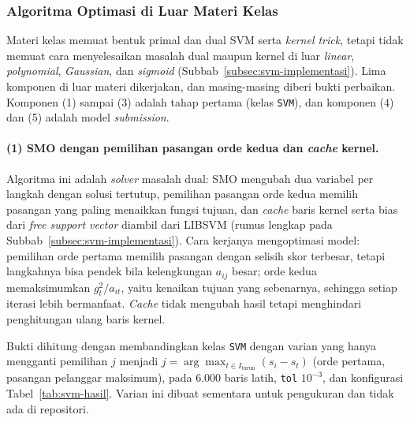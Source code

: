 \subsubsection{Algoritma Optimasi di Luar Materi Kelas}
\label{subsubsec:svm-optimasi}
Materi kelas memuat bentuk primal dan dual SVM serta \textit{kernel trick}, tetapi tidak memuat cara menyelesaikan masalah dual maupun kernel di luar \textit{linear}, \textit{polynomial}, \textit{Gaussian}, dan \textit{sigmoid} (Subbab~\ref{subsec:svm-implementasi}). Lima komponen di luar materi dikerjakan, dan masing-masing diberi bukti perbaikan. Komponen (1) sampai (3) adalah tahap pertama (kelas \texttt{SVM}), dan komponen (4) dan (5) adalah model \textit{submission}.

\paragraph{(1) SMO dengan pemilihan pasangan orde kedua dan \textit{cache} kernel.} Algoritma ini adalah \textit{solver} masalah dual: SMO \cite{platt1998smo} mengubah dua variabel per langkah dengan solusi tertutup, pemilihan pasangan orde kedua \cite{fan2005wss} memilih pasangan yang paling menaikkan fungsi tujuan, dan \textit{cache} baris kernel serta bias dari \textit{free support vector} diambil dari LIBSVM \cite{chang2011libsvm} (rumus lengkap pada Subbab~\ref{subsec:svm-implementasi}). Cara kerjanya mengoptimasi model: pemilihan orde pertama memilih pasangan dengan selisih skor terbesar, tetapi langkahnya bisa pendek bila kelengkungan $a_{ij}$ besar; orde kedua memaksimumkan $g_t^2/a_{it}$, yaitu kenaikan tujuan yang sebenarnya, sehingga setiap iterasi lebih bermanfaat. \textit{Cache} tidak mengubah hasil tetapi menghindari penghitungan ulang baris kernel.

Bukti dihitung dengan membandingkan kelas \texttt{SVM} dengan varian yang hanya mengganti pemilihan $j$ menjadi $j = \arg\max_{t \in I_{\text{turun}}} (s_i - s_t)$ (orde pertama, pasangan pelanggar maksimum), pada 6.000 baris latih, \texttt{tol} $10^{-3}$, dan konfigurasi Tabel~\ref{tab:svm-hasil}. Varian ini dibuat sementara untuk pengukuran dan tidak ada di repositori.

